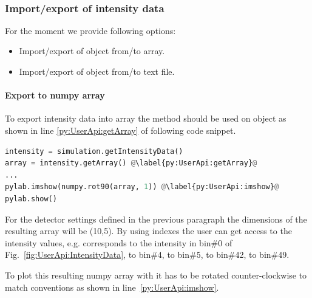 \\



\subsubsection{Import/export of intensity data}
For the moment we provide following options:
\begin{itemize}
\item Import/export of  object from/to  array.
\item Import/export of  object from/to text file.

\end{itemize}

\paragraph{Export to numpy array}

To export intensity data into   array the method  should be used 
on  object as shown in line \ref{py:UserApi:getArray} of
following code snippet.

\begin{lstlisting}[language=python, style=eclipseboxed]
intensity = simulation.getIntensityData()
array = intensity.getArray() @\label{py:UserApi:getArray}@
...
pylab.imshow(numpy.rot90(array, 1)) @\label{py:UserApi:imshow}@
pylab.show()
\end{lstlisting}

For the detector settings defined in the previous paragraph the dimensions of the resulting array will be (10,5). By using  indexes the user can get access to the intensity values, e.g.
 corresponds to the intensity in bin\#0 of Fig.~\ref{fig:UserApi:IntensityData},
 to bin\#4, 
 to bin\#5, 
 to bin\#42, 
 to bin\#49. 


To plot this resulting numpy array with  it has to be rotated counter-clockwise
to match  conventions as shown in line~\ref{py:UserApi:imshow}.


